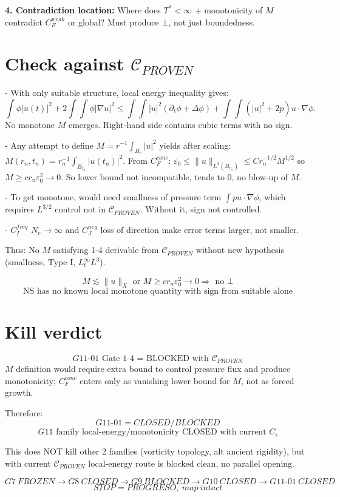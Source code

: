 \documentclass[11pt]{article}
\begin{document}
\textbf{4. Contradiction location:} Where does $T^*<\infty$ + monotonicity of $M$ contradict $C_E^{weak}$ or global? Must produce $\bot$, not just boundedness.

\section{Check against $\mathcal C_{PROVEN}$}

- With only suitable structure, local energy inequality gives:
\[
\int\phi|u(t)|^2+2\int\int\phi|\nabla u|^2\le\int\int|u|^2(\partial_t\phi+\Delta\phi)+\int\int(|u|^2+2p)u\cdot\nabla\phi.
\]
No monotone $M$ emerges. Right-hand side contains cubic terms with no sign.

- Any attempt to define $M=r^{-1}\int_{B_r}|u|^2$ yields after scaling: $M(r_n,t_n)=r_n^{-1}\int_{B_{r_n}}|u(t_n)|^2$. From $C_F^{conc}$: $\varepsilon_0\le\|u\|_{L^3(B_{r_n})}\le C r_n^{-1/2}M^{1/2}$ so $M\ge c r_n\varepsilon_0^2\to0$. So lower bound not incompatible, tends to 0, no blow-up of $M$.

- To get monotone, would need smallness of pressure term $\int p u\cdot\nabla\phi$, which requires $L^{3/2}$ control not in $\mathcal C_{PROVEN}$. Without it, sign not controlled.

- $C_I^{freq}$ $N_c\to\infty$ and $C_J^{neg}$ loss of direction make error terms larger, not smaller.

Thus: No $M$ satisfying 1-4 derivable from $\mathcal C_{PROVEN}$ without new hypothesis (smallness, Type I, $L^\infty_tL^3$).

\[
\boxed{M\lesssim\|u\|_X\text{ or }M\ge c r_n\varepsilon_0^2\to0 \Rightarrow\text{ no }\bot}
\]
\[
\boxed{\text{NS has no known local monotone quantity with sign from suitable alone}}
\]

\section{Kill verdict}
\[
\boxed{G11\text{-}01\text{ Gate 1-4 = BLOCKED with }\mathcal C_{PROVEN}}
\]
$M$ definition would require extra bound to control pressure flux and produce monotonicity; $C_F^{conc}$ enters only as vanishing lower bound for $M$, not as forced growth.

Therefore:
\[
\boxed{G11\text{-}01 = CLOSED/BLOCKED}
\]
\[
\boxed{G11\text{ family local-energy/monotonicity CLOSED with current }C_i}
\]

This does NOT kill other 2 families (vorticity topology, alt ancient rigidity), but with current $\mathcal C_{PROVEN}$ local-energy route is blocked clean, no parallel opening.

\[
\boxed{G7\ FROZEN\to G8\ CLOSED\to G9\ BLOCKED\to G10\ CLOSED\to G11\text{-}01\ CLOSED}
\]
\[
\boxed{STOP=PROGRESO,\ map\ intact}
\]
\end{document}
